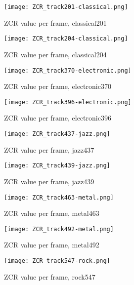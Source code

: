 \documentclass{article} %
\begin{document}
\begin{figure}[ht!]
\centering
\texttt{[image: ZCR\_track201-classical.png]}
\caption{ZCR value per frame, classical201}
\label{fig:ZCR_201}
\end{figure}

\begin{figure}[!hb]
\centering
\texttt{[image: ZCR\_track204-classical.png]}
\caption{ZCR value per frame, classical204}
\label{fig:ZCR_204}
\end{figure}

\begin{figure}
\centering
\texttt{[image: ZCR\_track370-electronic.png]}
\caption{ZCR value per frame, electronic370}
\label{fig:ZCR_370}
\end{figure}

\begin{figure}
\centering
\texttt{[image: ZCR\_track396-electronic.png]}
\caption{ZCR value per frame, electronic396}
\label{fig:ZCR_396}
\end{figure}

\begin{figure}
\centering
\texttt{[image: ZCR\_track437-jazz.png]}
\caption{ZCR value per frame, jazz437}
\label{fig:ZCR_437}
\end{figure}

\begin{figure}
\centering
\texttt{[image: ZCR\_track439-jazz.png]}
\caption{ZCR value per frame, jazz439}
\label{fig:ZCR_439}
\end{figure}

\begin{figure}
\centering
\texttt{[image: ZCR\_track463-metal.png]}
\caption{ZCR value per frame, metal463}
\label{fig:ZCR_463}
\end{figure}


\begin{figure}
\centering
\texttt{[image: ZCR\_track492-metal.png]}
\caption{ZCR value per frame, metal492}
\label{fig:ZCR_492}
\end{figure}


\begin{figure}
\centering
\texttt{[image: ZCR\_track547-rock.png]}
\caption{ZCR value per frame, rock547}
\label{fig:ZCR_547}
\end{figure}
\end{document}
